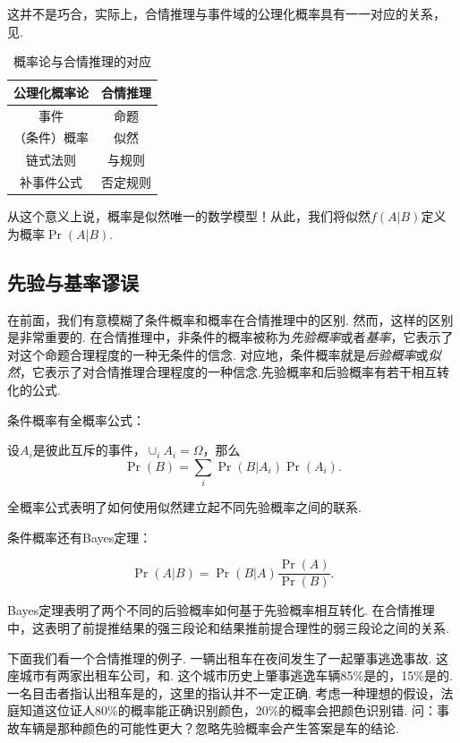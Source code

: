 这并不是巧合，实际上，合情推理与事件域的公理化概率具有一一对应的关系，见.
    \begin{table}[ht]
        \centering
        \begin{tabular}{c|c}
        \toprule
        公理化概率论&合情推理  \\\midrule
        事件 & 命题\\
        （条件）概率 & 似然\\
        链式法则 & 与规则\\
        补事件公式 & 否定规则\\
        \bottomrule
        \end{tabular}
        \caption{概率论与合情推理的对应}
        \label{tab:prob}
    \end{table}

从这个意义上说，概率是似然唯一的数学模型！从此，我们将似然$f(A|B)$定义为概率$\Pr(A|B)$.

\subsection{先验与基率谬误}

在前面，我们有意模糊了条件概率和概率在合情推理中的区别. 然而，这样的区别是非常重要的. 在合情推理中，非条件的概率被称为\textit{先验概率}或者\textit{基率}，它表示了对这个命题合理程度的一种无条件的信念. 对应地，条件概率就是\textit{后验概率}或\textit{似然}，它表示了对合情推理合理程度的一种信念.先验概率和后验概率有若干相互转化的公式.

条件概率有全概率公式：
\begin{theorem}[全概率公式]
设$A_i$是彼此互斥的事件，$\cup_i A_i=\Omega$，那么
    \[\Pr(B)=\sum_{i}\Pr(B|A_i)\Pr(A_i).\]
\end{theorem}
全概率公式表明了如何使用似然建立起不同先验概率之间的联系.

条件概率还有Bayes定理：
\begin{theorem}[Bayes定理]
    \[\Pr(A|B) = \Pr(B|A)\frac{\Pr(A)}{\Pr(B)}.\]
\end{theorem}
 Bayes定理表明了两个不同的后验概率如何基于先验概率相互转化. 在合情推理中，这表明了前提推结果的强三段论和结果推前提合理性的弱三段论之间的关系.

下面我们看一个合情推理的例子. 一辆出租车在夜间发生了一起肇事逃逸事故. 这座城市有两家出租车公司，和. 这个城市历史上肇事逃逸车辆85\%是的，15\%是的. 一名目击者指认出租车是的，这里的指认并不一定正确. 考虑一种理想的假设，法庭知道这位证人80\%的概率能正确识别颜色，20\%的概率会把颜色识别错. 问：事故车辆是那种颜色的可能性更大？忽略先验概率会产生答案是车的结论. 

